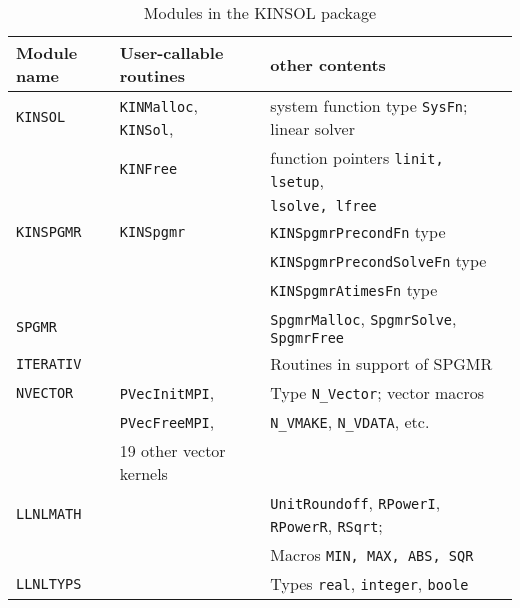 \documentclass[11pt]{article}
\begin{document}
\begin{table}%
\begin{center}
\caption{Modules in the KINSOL package}
\label{KINmodules}
\vspace{0.1 in}
\begin{tabular}{|l|l|l|} \hline
Module name & User-callable routines & other contents \\ \hline \hline
{\tt KINSOL} & {\tt KINMalloc}, {\tt KINSol}, & system function type {\tt SysFn};
 linear solver \\
            & {\tt KINFree}  & function pointers  {\tt linit, lsetup}, \\ 
            &       & {\tt lsolve, lfree} \\ \hline

{\tt KINSPGMR} &  {\tt KINSpgmr} &  {\tt KINSpgmrPrecondFn} type \\
         &           &  {\tt KINSpgmrPrecondSolveFn} type \\
         &           &  {\tt KINSpgmrAtimesFn} type \\ \hline
{\tt SPGMR}    & & {\tt SpgmrMalloc}, {\tt SpgmrSolve}, {\tt SpgmrFree} \\ \hline
{\tt ITERATIV} & & Routines in support of SPGMR \\ \hline
{\tt NVECTOR}  & {\tt PVecInitMPI},             & Type {\tt N\_Vector}; vector 
macros \\
         & {\tt PVecFreeMPI},            & {\tt N\_VMAKE}, {\tt N\_VDATA}, etc. \\
         & 19 other vector kernels  & \\ \hline
{\tt LLNLMATH} & & {\tt UnitRoundoff}, {\tt RPowerI}, {\tt RPowerR}, {\tt RSqrt}; \\
         & & Macros {\tt MIN, MAX, ABS, SQR} \\ \hline
{\tt LLNLTYPS} & & Types {\tt real}, {\tt integer}, {\tt boole} \\ \hline
\end{tabular}
\end{center}
\end{table}
\end{document}
